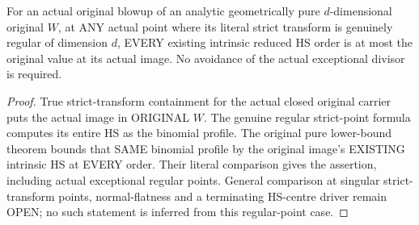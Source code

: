 \begin{theorem}
\label{hir:actual-blowup-intrinsic-hs-nonincreasing-at-regular-strict-point}
\leanok
For an actual original blowup of an analytic geometrically pure
$d$-dimensional original $W$, at ANY actual point where its literal strict
transform is genuinely regular of dimension $d$, EVERY existing
intrinsic reduced HS order is at most the original value at its actual
image. No avoidance of the actual exceptional divisor is required.
\end{theorem}
\begin{proof}
True strict-transform containment for the actual closed original carrier
puts the actual image in ORIGINAL $W$. The genuine regular strict-point
formula computes its entire HS as the binomial profile. The original
pure lower-bound theorem bounds that SAME binomial profile by the
original image's EXISTING intrinsic HS at EVERY order. Their literal
comparison gives the assertion, including actual exceptional regular
points. General comparison at singular strict-transform points,
normal-flatness and a terminating HS-centre driver remain OPEN; no
such statement is inferred from this regular-point case.
\end{proof}
